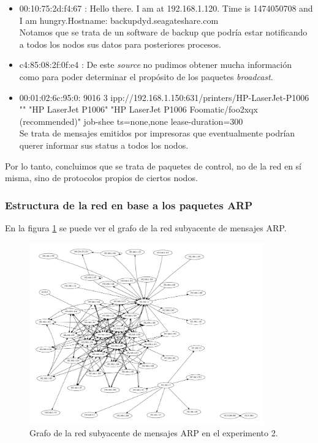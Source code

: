 \begin{itemize}
	\item 00:10:75:2d:f4:67	: Hello there. I am at 192.168.1.120. Time is 1474050708 and I am hungry.Hostname: backupdyd.seagateshare.com \\
		Notamos que se trata de un software de backup que podr\'ia estar notificando a todos los nodos sus datos para posteriores procesos.
            \item c4:85:08:2f:0f:e4	: De este \textit{source} no pudimos obtener mucha informaci\'on como para poder determinar el propósito de los paquetes \textit{broadcast}.
	\item 00:01:02:6c:95:0: 9016 3 ipp://192.168.1.150:631/printers/HP-LaserJet-P1006 "" "HP LaserJet P1006" "HP LaserJet P1006 Foomatic/foo2xqx (recommended)" job-shee    ts=none,none lease-duration=300 \\
		Se trata de mensajes emitidos por impresoras que eventualmente podr\'ian querer informar sus status a todos los nodos.
\end{itemize}

Por lo tanto, concluimos que se trata de paquetes de control, no de la red en sí misma, sino de protocolos propios de ciertos nodos.

\subsubsection{Estructura de la red en base a los paquetes ARP}

\par En la figura \ref{ARPlaburo} se puede ver el grafo de la red subyacente de mensajes ARP.

\begin{figure}[ht]
    \centering
    \includegraphics[width=0.9\textwidth]{figuras/laburo_grafo.pdf}
    \caption{Grafo de la red subyacente de mensajes ARP en el experimento 2.}\label{ARPlaburo}
\end{figure}

